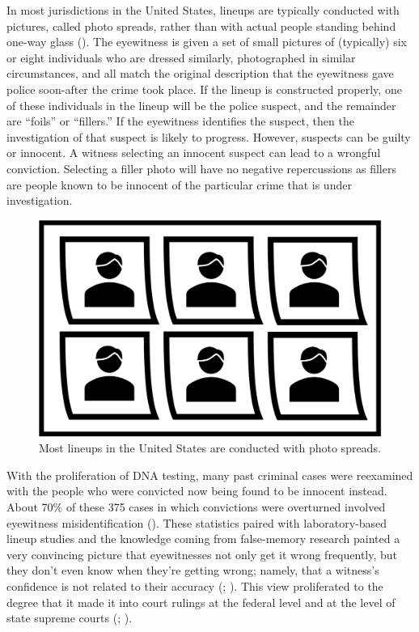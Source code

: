 \documentclass[
]{krantz}
\begin{document}
In most jurisdictions in the United States, lineups are typically conducted with pictures, called photo spreads, rather than with actual people standing behind one-way glass (). The eyewitness is given a set of small pictures of (typically) six or eight individuals who are dressed similarly, photographed in similar circumstances, and all match the original description that the eyewitness gave police soon-after the crime took place. If the lineup is constructed properly, one of these individuals in the lineup will be the police suspect, and the remainder are ``foils'' or ``fillers.'' If the eyewitness identifies the suspect, then the investigation of that suspect is likely to progress. However, suspects can be guilty or innocent. A witness selecting an innocent suspect can lead to a wrongful conviction. Selecting a filler photo will have no negative repercussions as fillers are people known to be innocent of the particular crime that is under investigation.

\begin{figure}

{\centering \includegraphics[width=0.6\linewidth]{images/ch6/lineup} 

}

\caption{Most lineups in the United States are conducted with photo spreads.}\label{fig:lineup}
\end{figure}

With the proliferation of DNA testing, many past criminal cases were reexamined with the people who were convicted now being found to be innocent instead. About 70\% of these 375 cases in which convictions were overturned involved eyewitness misidentification (). These statistics paired with laboratory-based lineup studies and the knowledge coming from false-memory research painted a very convincing picture that eyewitnesses not only get it wrong frequently, but they don't even know when they're getting wrong; namely, that a witness's confidence is not related to their accuracy (; ). This view proliferated to the degree that it made it into court rulings at the federal level and at the level of state supreme courts (; ).
\end{document}
